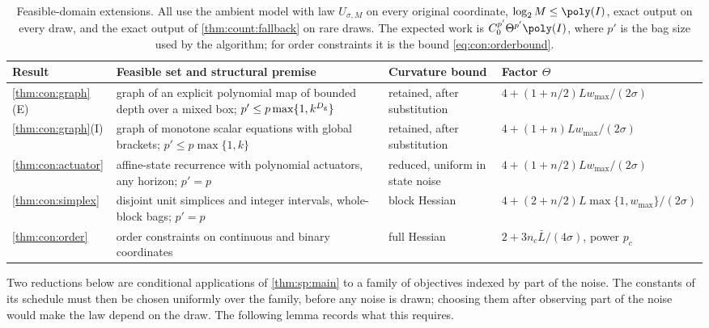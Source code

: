 \begin{table}[t]
\centering
\caption{Feasible-domain extensions. All use the ambient model with law
$U_{\sigma,M}$ on every original coordinate, $\log_2M\le\poly(I)$, exact
output on every draw, and the exact output of \cref{thm:count:fallback} on
rare draws. The
expected work is $C_0^{p'}\Theta^{p'}\poly(I)$, where $p'$ is the bag size
used by the algorithm; for order constraints it is the bound
\eqref{eq:con:orderbound}.}
\label{tab:con:summary}
\footnotesize
\begin{tabularx}{\textwidth}{@{}l>{\raggedright\arraybackslash}X>{\raggedright\arraybackslash}p{}l@{}}
\toprule
Result & Feasible set and structural premise & Curvature bound & Factor $\Theta$\\
\midrule
\cref{thm:con:graph}(E) & graph of an explicit polynomial map of bounded
depth over a mixed box; $p'\le p\max\{1,k^{D_{\rm g}}\}$ & retained, after
substitution & $4+(1+n/2)Lw_{\max}/(2\sigma)$\\
\cref{thm:con:graph}(I) & graph of monotone scalar equations with global
brackets; $p'\le p\max\{1,k\}$ & retained, after substitution &
$4+(1+n)Lw_{\max}/(2\sigma)$\\
\cref{thm:con:actuator} & affine-state recurrence with polynomial
actuators, any horizon; $p'=p$ & reduced, uniform in state noise &
$4+(1+n/2)Lw_{\max}/(2\sigma)$\\
\cref{thm:con:simplex} & disjoint unit simplices and integer intervals,
whole-block bags; $p'=p$ & block Hessian & $4+(2+n/2)L\max\{1,w_{\max}\}/(2\sigma)$\\
\cref{thm:con:order} & order constraints on continuous and binary
coordinates & full Hessian & $2+3n_c\bar L/(4\sigma)$, power $p_c$\\
\bottomrule
\end{tabularx}
\end{table}

Two reductions below are conditional applications of \cref{thm:sp:main} to
a family of objectives indexed by part of the noise. The constants of its
schedule must then be chosen uniformly over the family, before any noise is
drawn; choosing them after observing part of the noise would make the law
depend on the draw. The following lemma records what this requires.

